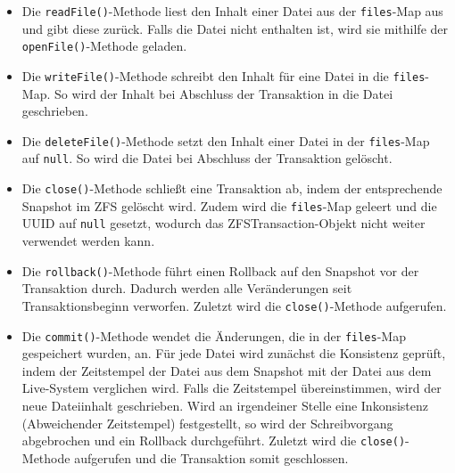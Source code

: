 \documentclass[12pt]{article}
\begin{document}
\begin{itemize}
	\item Die \texttt{readFile()}-Methode liest den Inhalt einer Datei aus der \texttt{files}-Map aus und gibt diese zurück.
	Falls die Datei nicht enthalten ist, wird sie mithilfe der \texttt{openFile()}-Methode geladen.
	
	\item Die \texttt{writeFile()}-Methode schreibt den Inhalt für eine Datei in die \texttt{files}-Map.
	So wird der Inhalt bei Abschluss der Transaktion in die Datei geschrieben.
	
	\item Die \texttt{deleteFile()}-Methode setzt den Inhalt einer Datei in der \texttt{files}-Map auf \texttt{null}.
	So wird die Datei bei Abschluss der Transaktion gelöscht.
	
	\item Die \texttt{close()}-Methode schließt eine Transaktion ab, indem der entsprechende Snapshot im ZFS gelöscht wird.
	Zudem wird die \texttt{files}-Map geleert und die UUID auf \texttt{null} gesetzt, wodurch das ZFSTransaction-Objekt nicht weiter verwendet werden kann.
	
	\item Die \texttt{rollback()}-Methode führt einen Rollback auf den Snapshot vor der Transaktion durch. 
	Dadurch werden alle Veränderungen seit Transaktionsbeginn verworfen.
	Zuletzt wird die \texttt{close()}-Methode aufgerufen.
	
	\item Die \texttt{commit()}-Methode wendet die Änderungen, die in der \texttt{files}-Map gespeichert wurden, an.
	Für jede Datei wird zunächst die Konsistenz geprüft, indem der Zeitstempel der Datei aus dem Snapshot mit der Datei aus dem Live-System verglichen wird.
	Falls die Zeitstempel übereinstimmen, wird der neue Dateiinhalt geschrieben.
	Wird an irgendeiner Stelle eine Inkonsistenz (Abweichender Zeitstempel) festgestellt, so wird der Schreibvorgang abgebrochen und ein Rollback durchgeführt.
	Zuletzt wird die \texttt{close()}-Methode aufgerufen und die Transaktion somit geschlossen.
\end{itemize}
\end{document}
